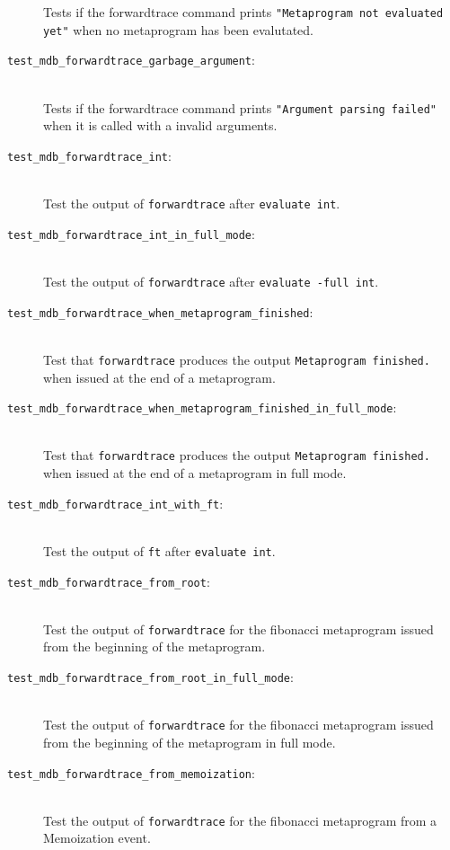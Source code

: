\begin{description}
        Tests if the forwardtrace command prints
        \texttt{"Metaprogram not evaluated yet"} when no metaprogram has been
        evalutated.
    \item[\texttt{test\_mdb\_forwardtrace\_garbage\_argument}:] \hfill \\
        Tests if the forwardtrace command prints
        \texttt{"Argument parsing failed"} when it is called with a invalid
        arguments.
    \item[\texttt{test\_mdb\_forwardtrace\_int}:] \hfill \\
        Test the output of \texttt{forwardtrace} after \texttt{evaluate int}.
    \item[\texttt{test\_mdb\_forwardtrace\_int\_in\_full\_mode}:] \hfill \\
        Test the output of \texttt{forwardtrace} after
        \texttt{evaluate -full int}.
    \item[\texttt{test\_mdb\_forwardtrace\_when\_metaprogram\_finished}:] \hfill \\
        Test that \texttt{forwardtrace} produces the output
        \texttt{Metaprogram finished.} when issued at the end of a metaprogram.
    \item[\texttt{test\_mdb\_forwardtrace\_when\_metaprogram\_finished\_in\_full\_mode}:] \hfill \\
        Test that \texttt{forwardtrace} produces the output
        \texttt{Metaprogram finished.} when issued at the end of a metaprogram
        in full mode.
    \item[\texttt{test\_mdb\_forwardtrace\_int\_with\_ft}:] \hfill \\
        Test the output of \texttt{ft} after \texttt{evaluate int}.
    \item[\texttt{test\_mdb\_forwardtrace\_from\_root}:] \hfill \\
        Test the output of \texttt{forwardtrace} for the fibonacci metaprogram
        issued from the beginning of the metaprogram.
    \item[\texttt{test\_mdb\_forwardtrace\_from\_root\_in\_full\_mode}:] \hfill \\
        Test the output of \texttt{forwardtrace} for the fibonacci metaprogram
        issued from the beginning of the metaprogram in full mode.
    \item[\texttt{test\_mdb\_forwardtrace\_from\_memoization}:] \hfill \\
        Test the output of \texttt{forwardtrace} for the fibonacci metaprogram
        from a Memoization event.

\end{description}
